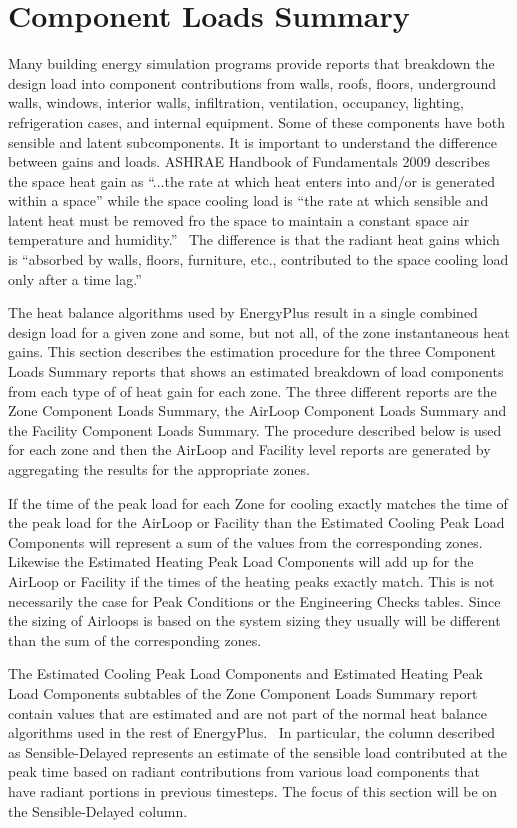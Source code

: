 \section{Component Loads Summary}\label{component-loads-summary}

Many building energy simulation programs provide reports that breakdown the design load into component contributions from walls, roofs, floors, underground walls, windows, interior walls, infiltration, ventilation, occupancy, lighting, refrigeration cases, and internal equipment. Some of these components have both sensible and latent subcomponents. It is important to understand the difference between gains and loads. ASHRAE Handbook of Fundamentals 2009 describes the space heat gain as ``...the rate at which heat enters into and/or is generated within a space'' while the space cooling load is ``the rate at which sensible and latent heat must be removed fro the space to maintain a constant space air temperature and humidity.''~ The difference is that the radiant heat gains which is ``absorbed by walls, floors, furniture, etc., contributed to the space cooling load only after a time lag.''

The heat balance algorithms used by EnergyPlus result in a single combined design load for a given zone and some, but not all, of the zone instantaneous heat gains. This section describes the estimation procedure for the three Component Loads Summary reports that shows an estimated breakdown of load components from each type of of heat gain for each zone. The three different reports are the Zone Component Loads Summary, the AirLoop Component Loads Summary and the Facility Component Loads Summary. The procedure described below is used for each zone and then the AirLoop and Facility level reports are generated by aggregating the results for the appropriate zones.

If the time of the peak load for each Zone for cooling exactly matches the time of the peak load for the AirLoop or Facility than the Estimated Cooling Peak Load Components will represent a sum of the values from the corresponding zones. Likewise the Estimated Heating Peak Load Components will add up for the AirLoop or Facility if the times of the heating peaks exactly match. This is not necessarily the case for Peak Conditions or the Engineering Checks tables. Since the sizing of Airloops is based on the system sizing they usually will be different than the sum of the corresponding zones. 

The Estimated Cooling Peak Load Components and Estimated Heating Peak Load Components subtables of the Zone Component Loads Summary report contain values that are estimated and are not part of the normal heat balance algorithms used in the rest of EnergyPlus.~ In particular, the column described as Sensible-Delayed represents an estimate of the sensible load contributed at the peak time based on radiant contributions from various load components that have radiant portions in previous timesteps. The focus of this section will be on the Sensible-Delayed column.

